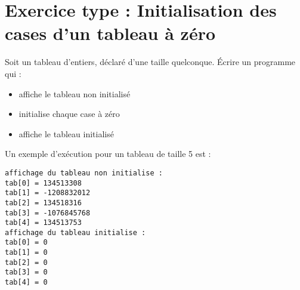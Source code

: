 \section{Exercice type : Initialisation des cases d'un tableau à zéro}

Soit un tableau d'entiers, déclaré d'une taille quelconque. Écrire un programme qui :
\begin{itemize}
\item affiche le tableau non initialisé
\item initialise chaque case à zéro
\item affiche le tableau initialisé
\end{itemize}

Un exemple d'exécution pour un tableau de taille 5 est :
\begin{small}
\begin{verbatim}
affichage du tableau non initialise :
tab[0] = 134513308
tab[1] = -1208832012
tab[2] = 134518316
tab[3] = -1076845768
tab[4] = 134513753
affichage du tableau initialise :
tab[0] = 0
tab[1] = 0
tab[2] = 0
tab[3] = 0
tab[4] = 0
\end{verbatim}
\end{small}
